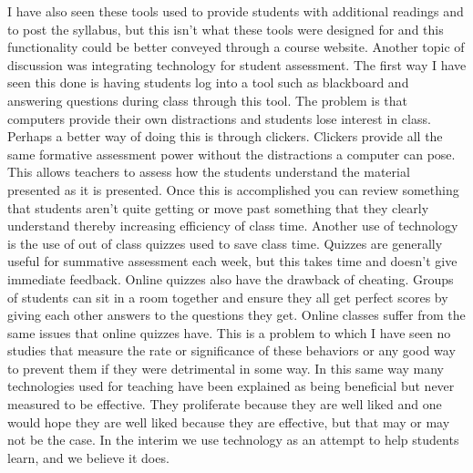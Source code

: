 \documentclass{article}
\begin{document}
I have also seen these tools used to provide students with additional readings and to post the syllabus, but this isn't what these tools were designed for and this functionality could be better conveyed through a course website. 
Another topic of discussion was integrating technology for student assessment. The first way I have seen this done is having students log into a tool such as blackboard and answering questions during class through this tool. The problem is that computers provide their own distractions and students lose interest in class. Perhaps a better way of doing this is through clickers. Clickers provide all the same formative assessment power without the distractions a computer can pose. This allows teachers to assess how the students understand the material presented as it is presented. Once this is accomplished you can review something that students aren't quite getting or move past something that they clearly understand thereby increasing efficiency of class time. 
Another use of technology is the use of out of class quizzes used to save class time. Quizzes are generally useful for summative assessment each week, but this takes time and doesn't give immediate feedback. Online quizzes also have the drawback of cheating. Groups of students can sit in a room together and ensure they all get perfect scores by giving each other answers to the questions they get. Online classes suffer from the same issues that online quizzes have. This is a problem to which I have seen no studies that measure the rate or significance of these behaviors or any good way to prevent them if they were detrimental in some way. In this same way many technologies used for teaching have been explained as being beneficial but never measured to be effective. They proliferate because they are well liked and one would hope they are well liked because they are effective, but that may or may not be the case. In the interim we use technology as an attempt to help students learn, and we believe it does. 
\end{document}
